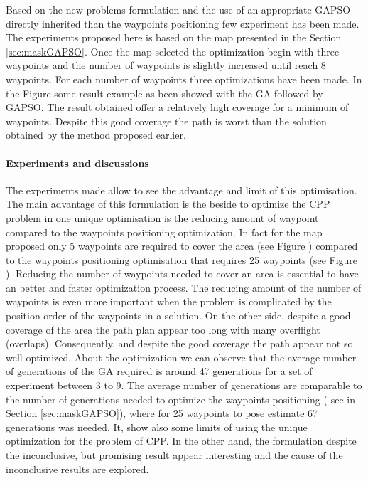 		
	Based on the new problems formulation and the use of an appropriate GAPSO directly inherited than the waypoints positioning few experiment has been made. The experiments proposed here is based on the map presented in the Section \ref{sec:maskGAPSO}.
  Once the map selected the optimization begin with three waypoints and the number of waypoints is slightly increased until reach 8 waypoints. For each number of waypoints  three optimizations have been made. In the Figure  some result example as been showed with the GA followed  by GAPSO. The result obtained offer a relatively high coverage for a minimum of waypoints. Despite this good coverage the path is worst than the solution obtained by the method proposed earlier.  

	\paragraph*{Experiments and discussions}	
The experiments made allow to see the advantage and limit of this optimisation. 
The main advantage of this formulation is the beside to optimize the CPP problem in one unique optimisation is the reducing amount of waypoint compared to the waypoints positioning optimization. In fact for the map proposed only  5 waypoints are required to cover  the area (see Figure ) compared to the waypoints positioning optimisation that requires 25 waypoints (see Figure ). Reducing the number of waypoints needed to cover an area is essential to have an better and faster optimization process. The reducing amount of the number of waypoints is even more important when the problem is complicated by the position order of the waypoints in a solution. 
	On the other side, despite a good coverage of the area the path plan appear too long with many overflight (overlaps). Consequently, and despite the good  coverage the path appear not so well optimized. 
	About the optimization we can observe that the average number of generations of the GA required is around 47 generations for a set of experiment between 3 to 9. The average number of generations  are  comparable to the number of generations needed to optimize the waypoints positioning ( see in Section \ref{sec:maskGAPSO}), where for 25 waypoints to pose estimate 67 generations was needed. 
	It, show also some limits of using the unique optimization for the problem of CPP. In the other hand, the formulation despite the inconclusive, but promising result appear interesting and the cause of the inconclusive results are explored.
	
